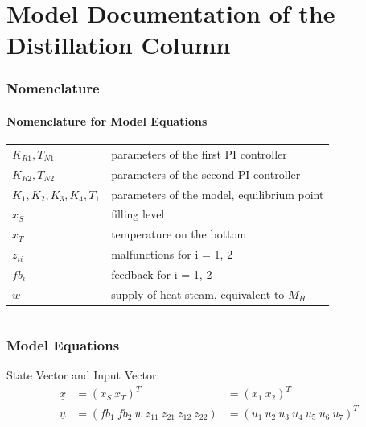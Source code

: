 \documentclass[10pt,a4paper]{article}
\begin{document}
	\part*{Model Documentation of the \\ Distillation Column} %
	
	
	\section{Nomenclature} %
	\subsection{Nomenclature for Model Equations} %
	
	\begin{tabular}{ll}
		$K_{R1}, T_{N1}$ & parameters of the first PI controller \\
		$K_{R2}, T_{N2}$ & parameters of the second PI controller \\
		$K_1, K_2, K_3, K_4, T_1$ & parameters of the model, equilibrium point \\
		$x_S$ & filling level\\
		$x_T$ & temperature on the bottom\\
		$z_{ii}$ & malfunctions for i = 1, 2 \\
		$fb_i$ & feedback for i = 1, 2 \\
		$w$ & supply of heat steam, equivalent to  $M_H$ \\
				
	\end{tabular}
	 
	
	\begin{tabular}{ll}

	\end{tabular}
	
	
	\section{Model Equations} %
	
	State Vector and Input Vector:
	\begin{align*}
		\underline{x} &= (x_S \ x_T)^T &= (x_1 \ x_2)^T \\
		\underline{u} &= (fb_1 \ fb_2 \ w \ z_{11} \ z_{21} \ z_{12} \ z_{22})
					  &= (u_1 \ u_2 \ u_3 \ u_4 \ u_5 \ u_6 \ u_7)^T \\
	\end{align*}
	
\end{document}
